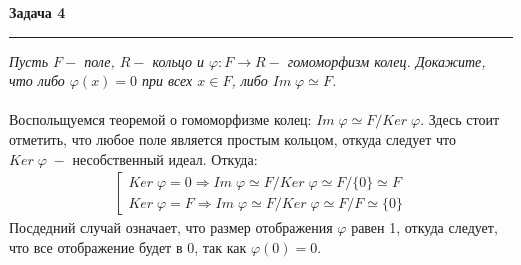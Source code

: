 \documentclass[a4paper,11pt]{article}
\begin{document}




\textbf{\large Задача 4}
\medskip\hrule\medskip
\textit{Пусть $ F - $ поле, $ R - $ кольцо и $ \varphi: F \to R - $ гомоморфизм колец. Докажите, что либо $ \varphi(x) = 0 $ при всех $ x \in F $, либо $ Im \; \varphi \simeq F $.}  \\ \\
Воспольщуемся теоремой о гомоморфизме колец: $ Im \;\varphi \simeq F/Ker \;\varphi $. Здесь стоит отметить, что любое поле является простым кольцом, откуда следует что $ Ker \; \varphi \; - $ несобственный идеал. Откуда:
\begin{gather*}
\left[
	\begin{gathered}
		Ker \; \varphi = 0 \Rightarrow Im \; \varphi \simeq F/Ker \; \varphi \simeq F/ \{0\} \simeq F  \\[2pt]
		Ker \; \varphi = F \Rightarrow Im \; \varphi \simeq F/Ker \; \varphi \simeq F/F \simeq \{0\}
	\end{gathered}
\right.
\end{gather*}
Посдедний случай означает, что размер отображения $ \varphi $ равен 1, откуда следует, что все отображение будет в $ 0 $, так как $ \varphi(0) = 0 $.
\end{document}
